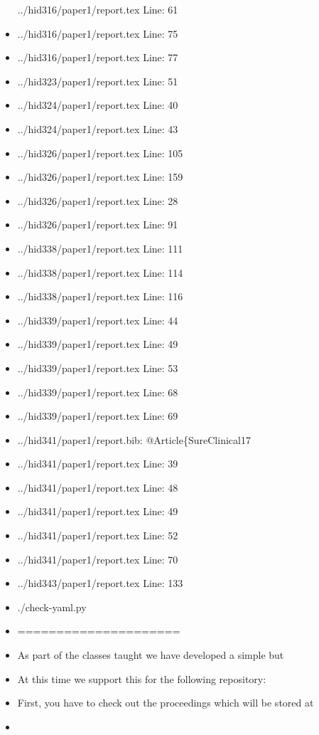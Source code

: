 \begin{itemize}
  ../hid316/paper1/report.tex Line: 61
\item
  ../hid316/paper1/report.tex Line: 75
\item
  ../hid316/paper1/report.tex Line: 77
\item
  ../hid323/paper1/report.tex Line: 51
\item
  ../hid324/paper1/report.tex Line: 40
\item
  ../hid324/paper1/report.tex Line: 43
\item
  ../hid326/paper1/report.tex Line: 105
\item
  ../hid326/paper1/report.tex Line: 159
\item
  ../hid326/paper1/report.tex Line: 28
\item
  ../hid326/paper1/report.tex Line: 91
\item
  ../hid338/paper1/report.tex Line: 111
\item
  ../hid338/paper1/report.tex Line: 114
\item
  ../hid338/paper1/report.tex Line: 116
\item
  ../hid339/paper1/report.tex Line: 44
\item
  ../hid339/paper1/report.tex Line: 49
\item
  ../hid339/paper1/report.tex Line: 53
\item
  ../hid339/paper1/report.tex Line: 68
\item
  ../hid339/paper1/report.tex Line: 69
\item
  ../hid341/paper1/report.bib: @Article\{SureClinical17
\item
  ../hid341/paper1/report.tex Line: 39
\item
  ../hid341/paper1/report.tex Line: 48
\item
  ../hid341/paper1/report.tex Line: 49
\item
  ../hid341/paper1/report.tex Line: 52
\item
  ../hid341/paper1/report.tex Line: 70
\item
  ../hid343/paper1/report.tex Line: 133
\item
  ./check-yaml.py
\item
  =====================
\item
  As part of the classes taught we have developed a simple but
\item
  At this time we support this for the following repository:
\item
  First, you have to check out the proceedings which will be stored at
\item

\end{itemize}
